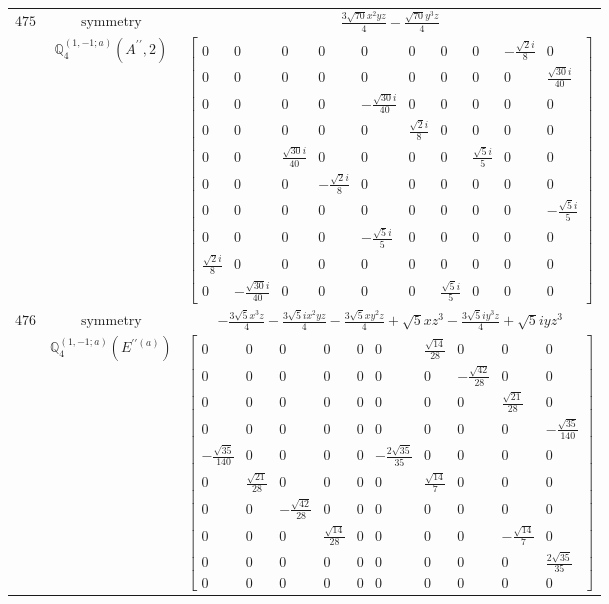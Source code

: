 \documentclass[fleqn,8pt,landscape]{jsarticle}
\begin{document}
\begin{longtable}{ccc}
$ 475 $ & $ \text{symmetry} $ & $ \frac{3 \sqrt{70} x^{2} y z}{4} - \frac{\sqrt{70} y^{3} z}{4} $ \\
$  $ & $ \mathbb{Q}_{4}^{(1,-1;a)}(A^{\prime\prime},2) $ & $ \begin{bmatrix} 0 & 0 & 0 & 0 & 0 & 0 & 0 & 0 & - \frac{\sqrt{2} i}{8} & 0 \\ 0 & 0 & 0 & 0 & 0 & 0 & 0 & 0 & 0 & \frac{\sqrt{30} i}{40} \\ 0 & 0 & 0 & 0 & - \frac{\sqrt{30} i}{40} & 0 & 0 & 0 & 0 & 0 \\ 0 & 0 & 0 & 0 & 0 & \frac{\sqrt{2} i}{8} & 0 & 0 & 0 & 0 \\ 0 & 0 & \frac{\sqrt{30} i}{40} & 0 & 0 & 0 & 0 & \frac{\sqrt{5} i}{5} & 0 & 0 \\ 0 & 0 & 0 & - \frac{\sqrt{2} i}{8} & 0 & 0 & 0 & 0 & 0 & 0 \\ 0 & 0 & 0 & 0 & 0 & 0 & 0 & 0 & 0 & - \frac{\sqrt{5} i}{5} \\ 0 & 0 & 0 & 0 & - \frac{\sqrt{5} i}{5} & 0 & 0 & 0 & 0 & 0 \\ \frac{\sqrt{2} i}{8} & 0 & 0 & 0 & 0 & 0 & 0 & 0 & 0 & 0 \\ 0 & - \frac{\sqrt{30} i}{40} & 0 & 0 & 0 & 0 & \frac{\sqrt{5} i}{5} & 0 & 0 & 0 \end{bmatrix} $ \\ \hline
$ 476 $ & $ \text{symmetry} $ & $ - \frac{3 \sqrt{5} x^{3} z}{4} - \frac{3 \sqrt{5} i x^{2} y z}{4} - \frac{3 \sqrt{5} x y^{2} z}{4} + \sqrt{5} x z^{3} - \frac{3 \sqrt{5} i y^{3} z}{4} + \sqrt{5} i y z^{3} $ \\
$  $ & $ \mathbb{Q}_{4}^{(1,-1;a)}(E^{\prime\prime(a)}) $ & $ \begin{bmatrix} 0 & 0 & 0 & 0 & 0 & 0 & \frac{\sqrt{14}}{28} & 0 & 0 & 0 \\ 0 & 0 & 0 & 0 & 0 & 0 & 0 & - \frac{\sqrt{42}}{28} & 0 & 0 \\ 0 & 0 & 0 & 0 & 0 & 0 & 0 & 0 & \frac{\sqrt{21}}{28} & 0 \\ 0 & 0 & 0 & 0 & 0 & 0 & 0 & 0 & 0 & - \frac{\sqrt{35}}{140} \\ - \frac{\sqrt{35}}{140} & 0 & 0 & 0 & 0 & - \frac{2 \sqrt{35}}{35} & 0 & 0 & 0 & 0 \\ 0 & \frac{\sqrt{21}}{28} & 0 & 0 & 0 & 0 & \frac{\sqrt{14}}{7} & 0 & 0 & 0 \\ 0 & 0 & - \frac{\sqrt{42}}{28} & 0 & 0 & 0 & 0 & 0 & 0 & 0 \\ 0 & 0 & 0 & \frac{\sqrt{14}}{28} & 0 & 0 & 0 & 0 & - \frac{\sqrt{14}}{7} & 0 \\ 0 & 0 & 0 & 0 & 0 & 0 & 0 & 0 & 0 & \frac{2 \sqrt{35}}{35} \\ 0 & 0 & 0 & 0 & 0 & 0 & 0 & 0 & 0 & 0 \end{bmatrix} $ \\ \hline

\end{longtable}
\end{document}
